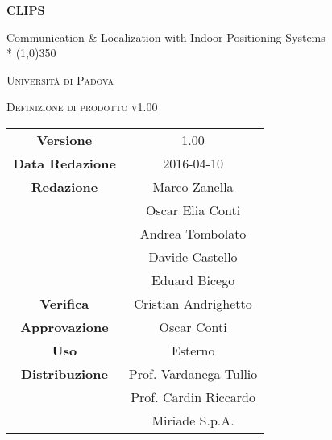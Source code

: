 \documentclass[a4paper,12pt]{article}
\author{}
\date{03/03/2016}
\begin{document}
\begin{titlepage}
	\centering
	{\huge\bfseries CLIPS\par}
	Communication \& Localization with Indoor Positioning Systems \\*
	\line(1,0){350} \\
	{\scshape\LARGE Università di Padova \par}
	\vspace{1cm}
	{\scshape\Large Definizione di prodotto v1.00\par}
	\logo
	
	\vfill \vfill
		\begin{tabular}{c|c}
			{\hfill \textbf{Versione}} 			& 1.00				\\
			{\hfill\textbf{Data Redazione}} 	& 2016-04-10	\\
			{\hfill\textbf{Redazione}} 			& Marco Zanella \\
												& Oscar Elia Conti \\
												& Andrea Tombolato \\
												& Davide Castello \\
												& Eduard Bicego 	\\ 
			{\hfill\textbf{Verifica}} 			& Cristian Andrighetto \\
			{\hfill\textbf{Approvazione}} 		& Oscar Conti		\\ 
			{\hfill\textbf{Uso}} 				& Esterno			\\ 
			{\hfill\textbf{Distribuzione}} 		& Prof. Vardanega Tullio \\
												& Prof. Cardin Riccardo \\
												& Miriade S.p.A. \\
		\end{tabular}
	\end{titlepage}
	
	\newpage
	\pagestyle{myfront}
		
	\newpage
		\tableofcontents
	\newpage
		\listoffigures	
	\label{LastFrontPage}
	\newpage
	
	\pagestyle{mymain}
	
	\newpage
		
		
	\newpage
		
		
	\newpage
			
		
	\newpage
		
		
	\newpage
		
		
	\newpage
		
		
		
	\label{LastPage}
\end{document}
